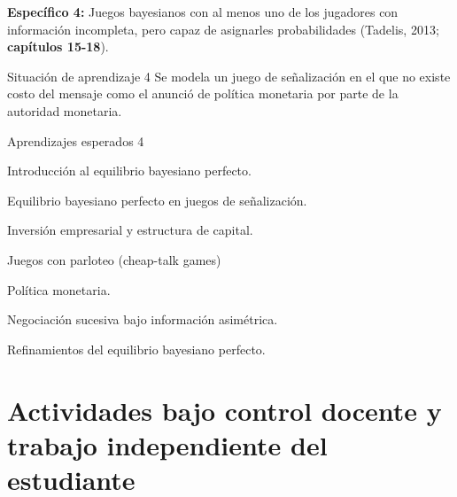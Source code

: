 \documentclass[11pt]{article}
\newenvironment{tight_enumerate}{
	\begin{enumerate}
		\setlength{\itemsep}{0pt}
		\setlength{\parskip}{0pt}
	}{\end{enumerate}}
\begin{document}
\begin{tcolorbox}[colback=bluerow!60]
	\textbf{Específico 4: }
	Juegos bayesianos con al menos uno de los jugadores con información incompleta, pero capaz de asignarles probabilidades (Tadelis, 2013; \textbf{capítulos 15-18}).
	\begin{mybox}[colback=redrow!80]{Situación de aprendizaje 4}
		Se modela un juego de señalización en el que no existe costo del mensaje como el anunció de política monetaria por parte de la autoridad monetaria.
	\end{mybox}
	
	\begin{mybox}[colback=purplerow!80]{Aprendizajes esperados 4}
		\begin{tight_enumerate}
			\item Introducción al equilibrio bayesiano perfecto.
			\item Equilibrio bayesiano perfecto en juegos de señalización.
			\item Inversión empresarial y estructura de capital.
			\item Juegos con parloteo (cheap-talk games)
			\item Política monetaria.
			\item Negociación sucesiva bajo información asimétrica.
			\item Refinamientos del equilibrio bayesiano perfecto.
		\end{tight_enumerate}
	\end{mybox}
\end{tcolorbox}

\section{Actividades bajo control docente y trabajo independiente del estudiante}
\end{document}
